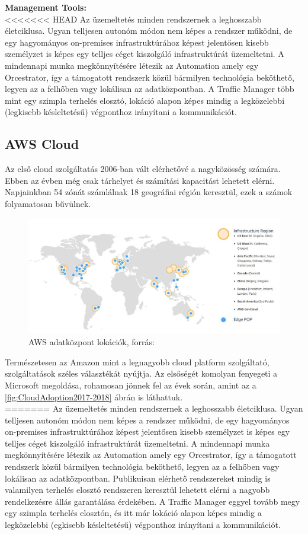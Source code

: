 \documentclass[12pt,oneside,justify,table]{book}
\begin{document}
\noindent \textbf{Management Tools:}\\
<<<<<<< HEAD
Az üzemeltetés minden rendszernek a leghosszabb életciklusa. Ugyan telljesen autonóm módon nem képes a rendszer működni, de egy hagyományos on-premises infrastruktúrához képest jelentősen kisebb személyzet is képes egy telljes céget kiszolgáló infrastruktúrát üzemeltetni. A mindennapi munka megkönnyítésére létezik az Automation amely egy Orcestrator, így a támogatott rendszerk közül bármilyen technológia beköthető, legyen az a felhőben vagy lokálisan az adatközpontban. A Traffic Manager több mint egy szimpla terhelés elosztó, lokáció alapon képes mindig a legközelebbi (legkisebb késleltetésű) végponthoz irányítani a kommunikációt. 

\subsection{AWS Cloud}
Az első cloud szolgáltatás 2006-ban vált elérhetővé a nagyközösség számára. Ebben az évben még csak tárhelyet és számítási kapacitást lehetett elérni. Napjainkban 54 zónát számlálnak 18 geográfiai régión keresztül, ezek a számok folyamatosan bűvülnek.
\begin{figure}[h]
\centering
\includegraphics[width=1\textwidth]{aws_locations.jpg}
\caption{AWS adatközpont lokációk, forrás: \cite{AWS_Regions}}
\label{fig:AWSRegions}
\end{figure}

Természetesen az Amazon mint a legnagyobb cloud platform szolgáltató, szolgáltatások széles választékát nyújtja. Az elsőségét komolyan fenyegeti a Microsoft megoldása, rohamosan jönnek fel az évek során, amint az a \ref{fig:CloudAdoption2017-2018} ábrán is láthattuk.  \\

=======
Az üzemeltetés minden rendszernek a leghosszabb életciklusa. Ugyan telljesen autonóm módon nem képes a rendszer működni, de egy hagyományos on-premises infrastruktúrához képest jelentősen kisebb személyzet is képes egy telljes céget kiszolgáló infrastruktúrát üzemeltetni. A mindennapi munka megkönnyítésére létezik az Automation amely egy Orcestrator, így a támogatott rendszerk közül bármilyen technológia beköthető, legyen az a felhőben vagy lokálisan az adatközpontban. Publikuisan elérhető rendszereket mindig is valamilyen terhelés elosztó rendszeren keresztül lehetett elérni a nagyobb rendelkezésre állás garantálása érdekében. A Traffic Manager eggyel tovább megy egy szimpla terhelés elosztón, és itt már lokáció alapon képes mindig a legközelebbi (egkisebb késleltetésű) végponthoz irányítani a kommunikációt.  \\
\newpage
\end{document}
